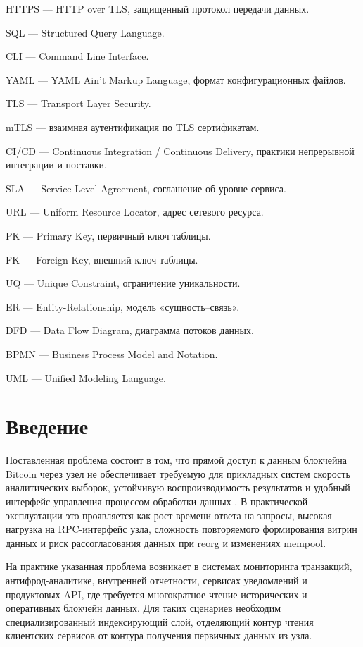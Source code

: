 ﻿\documentclass[14pt,a4paper]{extarticle}
\begin{document}
\noindent HTTPS — HTTP over TLS, защищенный протокол передачи данных.

\noindent SQL — Structured Query Language.

\noindent CLI — Command Line Interface.

\noindent YAML — YAML Ain't Markup Language, формат конфигурационных файлов.

\noindent TLS — Transport Layer Security.

\noindent mTLS — взаимная аутентификация по TLS сертификатам.

\noindent CI/CD — Continuous Integration / Continuous Delivery, практики непрерывной интеграции и поставки.

\noindent SLA — Service Level Agreement, соглашение об уровне сервиса.

\noindent URL — Uniform Resource Locator, адрес сетевого ресурса.

\noindent PK — Primary Key, первичный ключ таблицы.

\noindent FK — Foreign Key, внешний ключ таблицы.

\noindent UQ — Unique Constraint, ограничение уникальности.

\noindent ER — Entity-Relationship, модель «сущность--связь».

\noindent DFD — Data Flow Diagram, диаграмма потоков данных.

\noindent BPMN — Business Process Model and Notation.

\noindent UML — Unified Modeling Language.

\newpage

\section*{Введение}

\noindent Поставленная проблема состоит в том, что прямой доступ к данным блокчейна Bitcoin через узел не обеспечивает требуемую для прикладных систем скорость аналитических выборок, устойчивую воспроизводимость результатов и удобный интерфейс управления процессом обработки данных \cite{src_bitcoin_core}. В практической эксплуатации это проявляется как рост времени ответа на запросы, высокая нагрузка на RPC-интерфейс узла, сложность повторяемого формирования витрин данных и риск рассогласования данных при reorg и изменениях mempool.

\noindent На практике указанная проблема возникает в системах мониторинга транзакций, антифрод-аналитике, внутренней отчетности, сервисах уведомлений и продуктовых API, где требуется многократное чтение исторических и оперативных блокчейн данных. Для таких сценариев необходим специализированный индексирующий слой, отделяющий контур чтения клиентских сервисов от контура получения первичных данных из узла.
\end{document}
